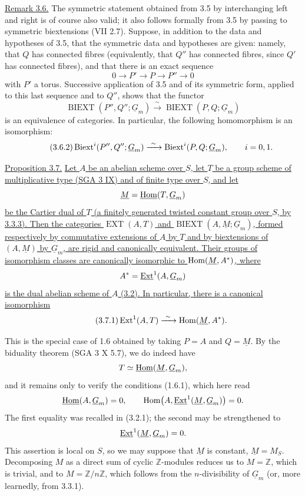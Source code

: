 \medskip
\noindent\underline{Remark 3.6.}  The symmetric statement obtained
from 3.5 by interchanging left and right is of course also valid; it
also follows formally from 3.5 by passing to symmetric biextensions
(VII 2.7).  Suppose, in addition to the data and hypotheses of 3.5,
that the symmetric data and hypotheses are given: namely, that $Q$
has connected fibres (equivalently, that $Q''$ has connected fibres,
since $Q'$ has connected fibres), and that there is an exact sequence
\[
 0\longrightarrow P'\longrightarrow P\longrightarrow P''
 \longrightarrow0
\]
with $P'$ a torus.  Successive application of 3.5 and of its
symmetric form, applied to this last sequence and to $Q''$, shows
that the functor
\begin{equation}\tag{3.6.1}
 \operatorname{BIEXT}(P'',Q'';\underline G_m)
 \xrightarrow{\ \sim\ }
 \operatorname{BIEXT}(P,Q;\underline G_m)
\end{equation}
is an equivalence of categories.  In particular, the following
homomorphism is an isomorphism:
\begin{equation}\tag{3.6.2}
 \Biext^i(P'',Q'';\underline G_m)
 \xrightarrow{\ \sim\ }
 \Biext^i(P,Q;\underline G_m),
 \qquad i=0,1.
\end{equation}

\medskip
\noindent\underline{Proposition 3.7.}  \underline{Let $A$ be an
abelian scheme over $S$, let $T$ be a group scheme of multiplicative
type (SGA 3 IX) and of finite type over $S$, and let}
\[
 \underline M=\uHom(T,\underline G_m)
\]
\underline{be the Cartier dual of $T$ (a finitely generated twisted
constant group over $S$, by 3.3.3).  Then the categories
$\operatorname{EXT}(A,T)$ and
$\operatorname{BIEXT}(A,\underline M;\underline G_m)$, formed
respectively by commutative extensions of $A$ by $T$ and by
biextensions of $(A,\underline M)$ by $\underline G_m$, are rigid and
canonically equivalent.  Their groups of isomorphism classes are
canonically isomorphic to $\Hom(\underline M,A^*)$, where}
\[
 A^*=\uExt^1(A,\underline G_m)
\]
\underline{is the dual abelian scheme of $A$ (3.2).  In particular,
there is a canonical isomorphism}
\begin{equation}\tag{3.7.1}
 \Ext^1(A,T)\xrightarrow{\ \sim\ }
 \Hom(\underline M,A^*).
\end{equation}

This is the special case of 1.6 obtained by taking $P=A$ and
$Q=\underline M$.  By the biduality theorem (SGA 3 X 5.7), we do
indeed have
\[
 T\simeq\uHom(\underline M,\underline G_m),
\]
and it remains only to verify the conditions (1.6.1), which here read
\[
 \uHom(A,\underline G_m)=0,
 \qquad
 \Hom\bigl(A,\uExt^1(\underline M,\underline G_m)\bigr)=0.
\]
The first equality was recalled in (3.2.1); the second may be
strengthened to
\[
 \uExt^1(\underline M,\underline G_m)=0.
\]
This assertion is local on $S$, so we may suppose that $\underline
M$ is constant, $\underline M=M_S$.  Decomposing $M$ as a direct sum
of cyclic $\mathbb Z$-modules reduces us to $M=\mathbb Z$, which is
trivial, and to $M=\mathbb Z/n\mathbb Z$, which follows from the
$n$-divisibility of $\underline G_m$ (or, more learnedly, from
3.3.1).

